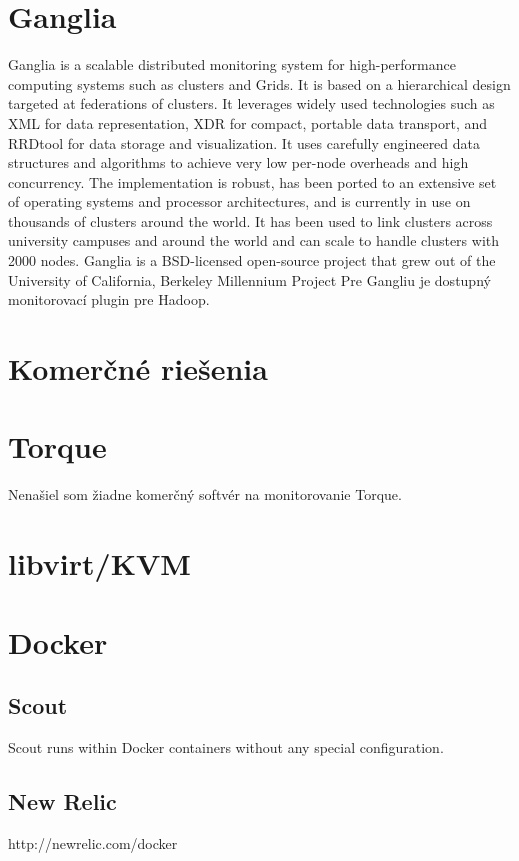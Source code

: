 \documentclass[11pt,final,oneside]{fithesis}
\begin{document}
\section{Ganglia} 
Ganglia is a scalable distributed monitoring system for high-performance computing systems such as clusters and Grids. It is based on a hierarchical design targeted at federations of clusters. It leverages widely used technologies such as XML for data representation, XDR for compact, portable data transport, and RRDtool for data storage and visualization. It uses carefully engineered data structures and algorithms to achieve very low per-node overheads and high concurrency. The implementation is robust, has been ported to an extensive set of operating systems and processor architectures, and is currently in use on thousands of clusters around the world. It has been used to link clusters across university campuses and around the world and can scale to handle clusters with 2000 nodes.
Ganglia is a BSD-licensed open-source project that grew out of the University of California, Berkeley Millennium Project
\cite{15}
Pre Gangliu je dostupný monitorovací plugin pre Hadoop.
\cite{16}

\section{Komerčné riešenia}

\section{Torque}
Nenašiel som žiadne komerčný softvér na monitorovanie Torque. 

\section{libvirt/KVM}

\section{Docker}
\subsection{Scout}
Scout runs within Docker containers without any special configuration. \cite{scout}

\subsection{New Relic}
http://newrelic.com/docker
\end{document}
